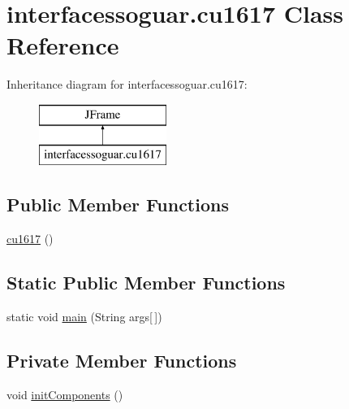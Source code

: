 \hypertarget{classinterfacessoguar_1_1cu1617}{}\section{interfacessoguar.\+cu1617 Class Reference}
\label{classinterfacessoguar_1_1cu1617}
Inheritance diagram for interfacessoguar.\+cu1617\+:\begin{figure}[H]
\begin{center}
\leavevmode
\includegraphics[height=2.000000cm]{classinterfacessoguar_1_1cu1617}
\end{center}
\end{figure}
\subsection*{Public Member Functions}
\begin{DoxyCompactItemize}
\item 
\mbox{\hyperlink{classinterfacessoguar_1_1cu1617_a372c757ba474fc10b267c6722f3a6f1c}{cu1617}} ()
\end{DoxyCompactItemize}
\subsection*{Static Public Member Functions}
\begin{DoxyCompactItemize}
\item 
static void \mbox{\hyperlink{classinterfacessoguar_1_1cu1617_aee8e1c23f84bb7c8c65ac36fa35c32e4}{main}} (String args\mbox{[}$\,$\mbox{]})
\end{DoxyCompactItemize}
\subsection*{Private Member Functions}
\begin{DoxyCompactItemize}
\item 
void \mbox{\hyperlink{classinterfacessoguar_1_1cu1617_a9959a875cf17a99c7e4e8d8bbbc8924f}{init\+Components}} ()
\end{DoxyCompactItemize}
